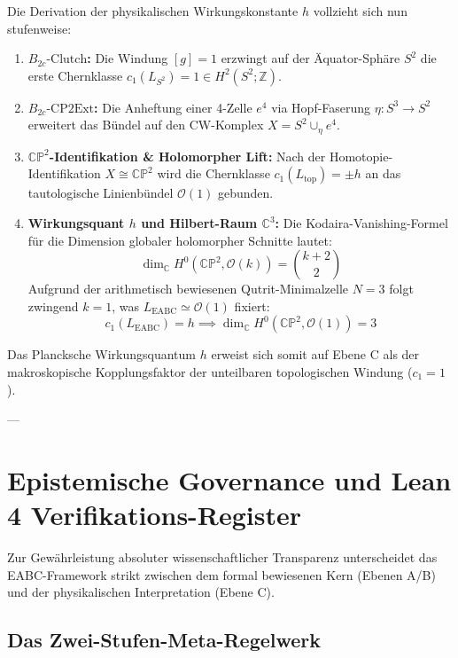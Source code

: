 \documentclass[11pt,a4paper]{article}
\begin{document}
Die Derivation der physikalischen Wirkungskonstante $h$ vollzieht sich nun stufenweise:
\begin{enumerate}
    \item \textbf{$B_{2c}\text{-Clutch}$:} Die Windung $[g] = 1$ erzwingt auf der Äquator-Sphäre $S^2$ die erste Chernklasse $c_1(L_{S^2}) = 1 \in H^2(S^2; \mathbb{Z})$.
    \item \textbf{$B_{2c}\text{-CP2Ext}$:} Die Anheftung einer 4-Zelle $e^4$ via Hopf-Faserung $\eta : S^3 \to S^2$ erweitert das Bündel auf den CW-Komplex $X = S^2 \cup_\eta e^4$.
    \item \textbf{$\mathbb{CP}^2$-Identifikation \& Holomorpher Lift:} Nach der Homotopie-Identifikation $X \cong \mathbb{CP}^2$ wird die Chernklasse $c_1(L_{\text{top}}) = \pm h$ an das tautologische Linienbündel $\mathcal{O}(1)$ gebunden.
    \item \textbf{Wirkungsquant $h$ und Hilbert-Raum $\mathbb{C}^3$:} Die Kodaira-Vanishing-Formel für die Dimension globaler holomorpher Schnitte lautet:
    \begin{equation}
    \dim_{\mathbb{C}} H^0(\mathbb{CP}^2, \mathcal{O}(k)) = \binom{k+2}{2}
    \end{equation}
    Aufgrund der arithmetisch bewiesenen Qutrit-Minimalzelle $N=3$ folgt zwingend $k=1$, was $L_{\text{EABC}} \simeq \mathcal{O}(1)$ fixiert:
    \begin{equation}
    c_1(L_{\text{EABC}}) = h \implies \dim_{\mathbb{C}} H^0(\mathbb{CP}^2, \mathcal{O}(1)) = 3
    \end{equation}
\end{enumerate}

Das Plancksche Wirkungsquantum $h$ erweist sich somit auf Ebene C als der makroskopische Kopplungsfaktor der unteilbaren topologischen Windung ($c_1 = 1$).

---

\section{Epistemische Governance und Lean 4 Verifikations-Register}

Zur Gewährleistung absoluter wissenschaftlicher Transparenz unterscheidet das EABC-Framework strikt zwischen dem formal bewiesenen Kern (Ebenen A/B) und der physikalischen Interpretation (Ebene C).

\subsection{Das Zwei-Stufen-Meta-Regelwerk}
\end{document}
